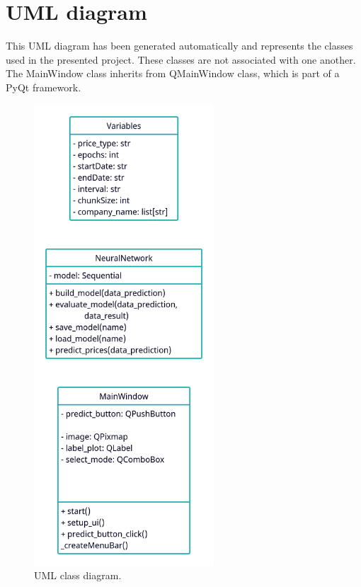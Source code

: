\section{UML diagram}
This UML diagram has been generated automatically and represents the classes used in the presented project. These classes are not associated with one another. The MainWindow class inherits from QMainWindow class, which is part of a PyQt framework.
\begin{figure}
  \centering
  \includegraphics[width=0.6\textwidth]{./graf/UML.png}

  \caption{UML class diagram.}
  \label{fig:label}
  \end{figure} 